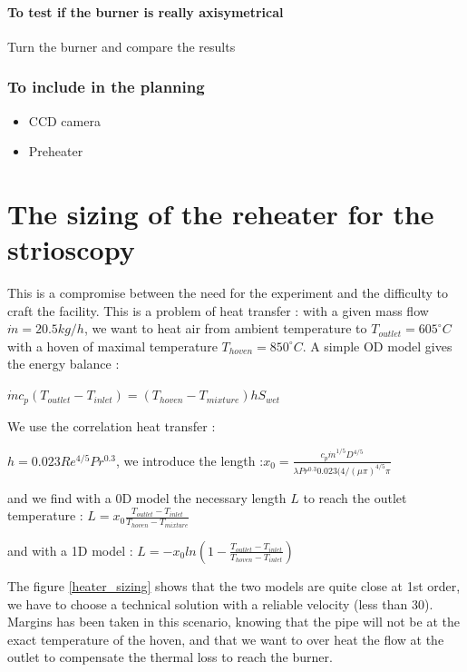 \paragraph{To test if the burner is really axisymetrical} Turn the burner and compare the results

\subsubsection{To include in the planning}
\begin{itemize}
\item CCD camera
\item Preheater
\end{itemize}
\section{The sizing of the reheater for the strioscopy}

  This is a compromise between the need for the experiment and the difficulty to craft the facility. This is a problem of heat transfer : with a given mass flow $\dot{m}=20.5 kg/h$, we want to heat air from ambient temperature to $T_{outlet}=605^\circ C$ with a hoven of maximal temperature $T_{hoven}=850^\circ C$. A simple OD model gives the energy balance :
  
  $\dot{m} c_{p} (T_{outlet} -T_{inlet})=(T_{hoven}-T_{mixture}) h S_{wet}$
  
  We use the correlation heat transfer : 
  
  $h=0.023 Re^{4/5} Pr^{0.3}$,  we introduce the length :$x_{0}=\frac{c_{p} \dot{m}^{1/5}D^{4/5}}{\lambda Pr^{0.3} 0.023 (4/(\mu \pi)^{4/5}\pi}$ 
 
and we find with a 0D model the necessary length $L$ to reach the outlet temperature : $L=x_{0} \frac{T_{outlet} -T_{inlet}}{T_{hoven}-T_{mixture}}$ 

and with a 1D model : $L=-x_{0} ln(1-\frac{T_{outlet} -T_{inlet}}{T_{hoven}-T_{inlet}})$  

The figure \ref{heater_sizing} shows that the two models are quite close at 1st order, we have to choose a technical solution with a reliable velocity (less than 30). Margins has been taken in this scenario, knowing that the pipe will not be at the exact temperature of the hoven, and that we want to over heat the flow at the outlet to compensate the thermal loss to reach the burner.

